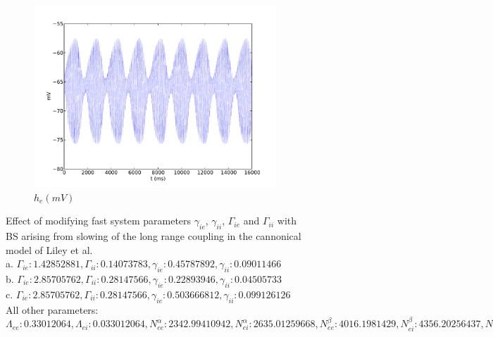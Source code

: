 \documentclass[a4paper,12pt]{article}
\begin{document}
\begin{figure}
\begin{subfigure}[b]{0.3\textwidth}
		\includegraphics[scale=0.22]{chosen-frontiers-2012/00416-1_1-2-1-he-phi.pdf}
		\caption{$h_e (mV)$}
	\end{subfigure}

	\label{fig:phi_fast_var}
	\caption{Effect of modifying fast system parameters $\gamma_{ie}$, $\gamma_{ii}$, $\Gamma_{ie}$ and $\Gamma_{ii}$ with BS arising from slowing of the long range coupling in the cannonical model of Liley et al.\\
	a. $\Gamma_{ie}: 1.42852881, \Gamma_{ii}: 0.14073783, \gamma_{ie}: 0.45787892, \gamma_{ii}: 0.09011466$ \\
	b. $\Gamma_{ie}: 2.85705762, \Gamma_{ii}: 0.28147566, \gamma_{ie}: 0.22893946,  \gamma_{ii}: 0.04505733$\\
	c. $\Gamma_{ie}: 2.85705762, \Gamma_{ii}: 0.28147566, \gamma_{ie}: 0.503666812,  \gamma_{ii}: 0.099126126$\\
All other parameters:\\
$\Lambda_{ee}: 0.33012064, \Lambda_{ei}: 0.033012064, N^{\alpha}_{ee}: 2342.99410942, N^{\alpha}_{ei}: 2635.01259668,
N^{\beta}_{ee}: 4016.1981429, N^{\beta}_{ei}: 4356.20256437, N^{\beta}_{ie}: 634.73935613, N^{\beta}_{ii}: 473.38388612,
\Gamma_{ee}: 0.13699266, \Gamma_{ei}: 0.4439827, \gamma_{ee}: 0.244953287255, \gamma_{ei}: 0.82969594, h^{rest}_e: -61.7485641, h^{eq}_{ee}: 5.73011624, h^{eq}_{ei}: 2.099135,
h^{rest}_i: -64.46142322, h^{eq}_{ie}: -81.67044311, h^{eq}_{ii}: -82.29433835, \mu_e: -53.10048735, \mu_i: -53.68380602, p_{ee}: 3.6997382629, p_{ei}: 0.60015865013, p_{ie}: 0.0, p_{ii}: 0.0, \phi_{ie}: 0,
\phi_{ii}: 0, S^{max}_e: 0.0930382, S^{max}_i: 0.0648537, \sigma_e: 4.64535035,
\sigma_i: 3.10925431, \tau_e: 86.1876, \tau_i: 65.0391, v_{ee}: 0.160606, v_{ei}: 0.160606$
}

\end{figure}
\end{document}
